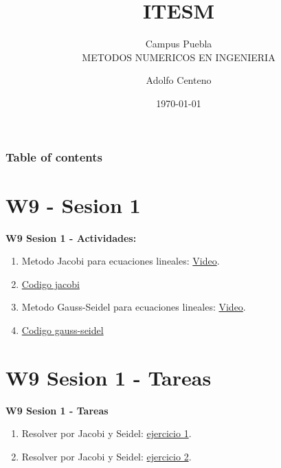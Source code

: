 \documentclass{beamer}
\begin{document}
\title{ITESM}  
\subtitle{Campus Puebla\\METODOS NUMERICOS EN INGENIERIA
}
\author{Adolfo Centeno}
\date{\today} 


\begin{frame}
\titlepage
\end{frame}

\begin{frame}\frametitle{Table of contents}
\tableofcontents
\end{frame} 


\section{W9 - Sesion 1 }

\begin{frame}

\textbf{W9 Sesion 1 - Actividades:}

\begin{enumerate}
\item
	Metodo Jacobi para ecuaciones lineales: \href{https://www.youtube.com/watch?v=TD83oN2LNdo}{Video}.	
\item
	\href{}{Codigo jacobi} 

\item
	Metodo Gauss-Seidel para ecuaciones lineales: \href{https://www.youtube.com/watch?v=abAe4418VdA&t=8s}{Video}.	
\item
	\href{}{Codigo gauss-seidel} 
	

\end{enumerate} 

\end{frame}


\section{W9 Sesion 1 - Tareas }

\begin{frame}


\textbf{W9 Sesion 1 - Tareas}


\begin{enumerate}
\item
	Resolver por Jacobi y Seidel: \href{https://www.youtube.com/watch?v=lEtDw4HUAmY&t=858s}{ejercicio 1}.	
\item
	Resolver por Jacobi y Seidel: \href{https://www.youtube.com/watch?v=k2dB1IVWTng}{ejercicio 2}.	

\end{enumerate} 


\end{frame}
\end{document}
